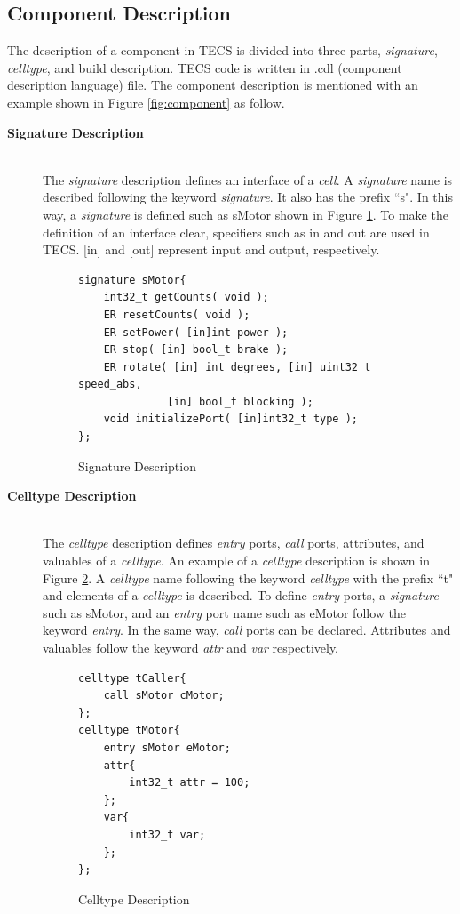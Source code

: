 \documentclass[a4j,12pt,oneside,openany,english]{jsbook}
\begin{document}
\subsection{Component Description}

The description of a component in TECS is divided into three parts, {\it signature}, {\it celltype}, and build description.
TECS code is written in .cdl (component description language) file.
The component description is mentioned with an example shown in Figure \ref{fig:component} as follow.

\begin{description}
    \item[{\bf Signature Description}]\mbox{}\\
        The {\it signature} description defines an interface of a {\it cell}.
        A {\it signature} name is described following the keyword {\it signature}.
        It also has the prefix ``s".
        In this way, a {\it signature} is defined such as sMotor shown in Figure \ref{signature}.
        To make the definition of an interface clear, specifiers such as in and out are used in TECS.
        [in] and [out] represent input and output, respectively.\\
\begin{figure}[t]
\centering
\begin{lstlisting}
signature sMotor{
    int32_t getCounts( void );
    ER resetCounts( void );
    ER setPower( [in]int power );
    ER stop( [in] bool_t brake );
    ER rotate( [in] int degrees, [in] uint32_t speed_abs,
              [in] bool_t blocking );
    void initializePort( [in]int32_t type );
};
\end{lstlisting}
\caption{Signature Description}
\label{signature}
\end{figure}

    \item[{\bf Celltype Description}]\mbox{}\\
        The {\it celltype} description defines {\it entry} ports, {\it call} ports, attributes, and valuables of a {\it celltype}.
        An example of a {\it celltype} description is shown in Figure \ref{celltype}.
        A {\it celltype} name following the keyword {\it celltype} with the prefix ``t" and elements of a {\it celltype} is described.
        To define {\it entry} ports, a {\it signature} such as sMotor, and an {\it entry} port name such as eMotor follow the keyword {\it entry}.
        In the same way, {\it call} ports can be declared.
        Attributes and valuables follow the keyword {\it attr} and {\it var} respectively.\\
\begin{figure}[t]
\centering
\begin{lstlisting}
celltype tCaller{
    call sMotor cMotor;
};
celltype tMotor{
    entry sMotor eMotor;
    attr{
        int32_t attr = 100;
    };
    var{
        int32_t var;
    };
};
\end{lstlisting}
\caption{Celltype Description}
\label{celltype}
\end{figure}


\end{description}
\end{document}
